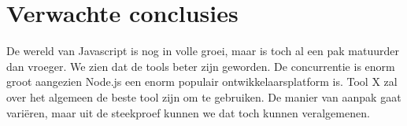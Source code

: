 \section{Verwachte conclusies}
\label{sec:verwachte_conclusies}

De wereld van Javascript is nog in volle groei, maar is toch al een pak matuurder dan vroeger. We zien dat de tools beter zijn geworden. De concurrentie is enorm groot aangezien Node.js een enorm populair ontwikkelaarsplatform is. Tool X zal over het algemeen de beste tool zijn om te gebruiken. De manier van aanpak gaat variëren, maar uit de steekproef kunnen we dat toch kunnen veralgemenen.

